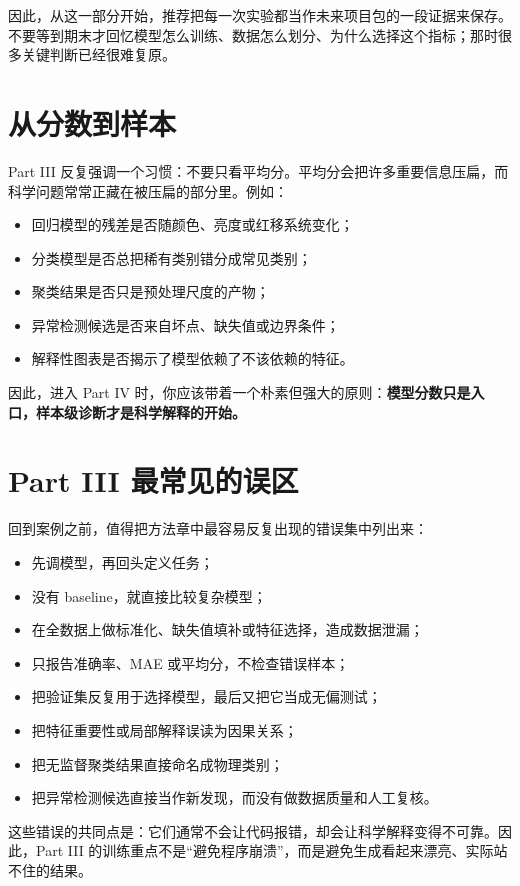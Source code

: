 因此，从这一部分开始，推荐把每一次实验都当作未来项目包的一段证据来保存。不要等到期末才回忆模型怎么训练、数据怎么划分、为什么选择这个指标；那时很多关键判断已经很难复原。

\section*{从分数到样本}

Part III 反复强调一个习惯：不要只看平均分。平均分会把许多重要信息压扁，而科学问题常常正藏在被压扁的部分里。例如：

\begin{itemize}
    \item 回归模型的残差是否随颜色、亮度或红移系统变化；
    \item 分类模型是否总把稀有类别错分成常见类别；
    \item 聚类结果是否只是预处理尺度的产物；
    \item 异常检测候选是否来自坏点、缺失值或边界条件；
    \item 解释性图表是否揭示了模型依赖了不该依赖的特征。
\end{itemize}

因此，进入 Part IV 时，你应该带着一个朴素但强大的原则：\textbf{模型分数只是入口，样本级诊断才是科学解释的开始。}

\section*{Part III 最常见的误区}

回到案例之前，值得把方法章中最容易反复出现的错误集中列出来：

\begin{itemize}
    \item 先调模型，再回头定义任务；
    \item 没有 baseline，就直接比较复杂模型；
    \item 在全数据上做标准化、缺失值填补或特征选择，造成数据泄漏；
    \item 只报告准确率、MAE 或平均分，不检查错误样本；
    \item 把验证集反复用于选择模型，最后又把它当成无偏测试；
    \item 把特征重要性或局部解释误读为因果关系；
    \item 把无监督聚类结果直接命名成物理类别；
    \item 把异常检测候选直接当作新发现，而没有做数据质量和人工复核。
\end{itemize}

这些错误的共同点是：它们通常不会让代码报错，却会让科学解释变得不可靠。因此，Part III 的训练重点不是“避免程序崩溃”，而是避免生成看起来漂亮、实际站不住的结果。

